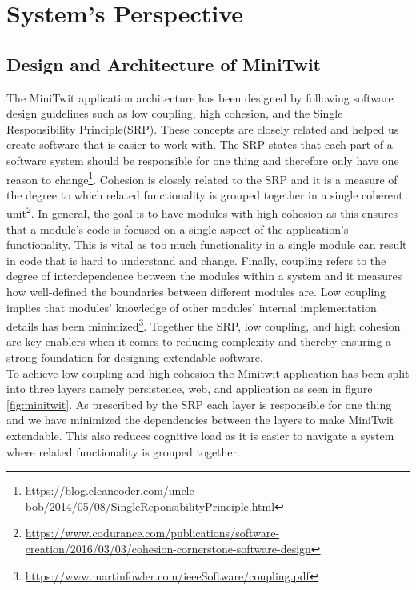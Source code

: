 \section{System's Perspective}

\subsection{Design and Architecture of MiniTwit}
The MiniTwit application architecture has been designed by following software design guidelines such as low coupling, high cohesion, and the Single Responsibility Principle(SRP). 
These concepts are closely related and helped us create software that is easier to work with. The SRP states that each part of a software system should be responsible for one thing and therefore only have one reason to change\footnote{\url{https://blog.cleancoder.com/uncle-bob/2014/05/08/SingleReponsibilityPrinciple.html}}. 
Cohesion is closely related to the SRP and it is a measure of the degree to which related functionality is grouped together in a single coherent unit\footnote{\url{https://www.codurance.com/publications/software-creation/2016/03/03/cohesion-cornerstone-software-design}}. 
In general, the goal is to have modules with high cohesion as this ensures that a module's code is focused on a single aspect of the application's functionality. 
This is vital as too much functionality in a single module can result in code that is hard to understand and change. 
Finally, coupling refers to the degree of interdependence between the modules within a system and it measures how well-defined the boundaries between different modules are. 
Low coupling implies that modules' knowledge of other modules' internal implementation details has been minimized\footnote{\url{https://www.martinfowler.com/ieeeSoftware/coupling.pdf}}. 
Together the SRP, low coupling, and high cohesion are key enablers when it comes to reducing complexity and thereby ensuring a strong foundation for designing extendable software. \\

To achieve low coupling and high cohesion the Minitwit application has been split into three layers namely persistence, web, and application as seen in figure \ref{fig:minitwit}. 
As prescribed by the SRP each layer is responsible for one thing and we have minimized the dependencies between the layers to make MiniTwit extendable.
 This also reduces cognitive load as it is easier to navigate a system where related functionality is grouped together. 


